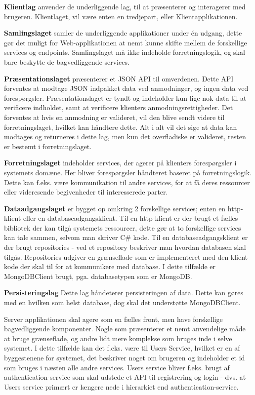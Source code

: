 \textbf{Klientlag} anvender de underliggende lag, til at præsenterer og interagerer med brugeren. Klientlaget, vil være enten en tredjepart, eller Klientapplikationen.

\textbf{Samlingslaget} samler de underliggende applikationer under én udgang, dette gør det muligt for Web-applikationen at nemt kunne skifte mellem de forskellige services og endpoints. Samlingslaget må ikke indeholde forretningslogik, og skal bare beskytte de bagvedliggende services.

\textbf{Præsentationslaget} præsenterer et JSON API til omverdenen. Dette API forventes at modtage JSON \cite[JSON]{converge-terms} indpakket data ved anmodninger, og ingen data ved forespørgsler. Præsentationslaget er tyndt og indeholder kun lige nok data til at verificere indholdet, samt at verificere klienters anmodningsrettigheder. Det forventes at hvis en anmodning er valideret, vil den blive sendt videre til forretningslaget, hvilket kan håndtere dette. Alt i alt vil det sige at data kan modtages og returneres i dette lag, men kun det overfladiske er valideret, resten er bestemt i forretningslaget.

\textbf{Forretningslaget} indeholder services, der agerer på klienters forespørgsler i systemets domæne. Her bliver forespørgsler håndteret baseret på forretningslogik. Dette kan f.eks. være kommunikation til andre services, for at få deres ressourcer eller videresende begivenheder til interesserede parter.

\textbf{Dataadgangslaget} er bygget op omkring 2 forskellige services; enten en http-klient eller en databaseadgangsklient. Til en http-klient er der brugt et fælles bibliotek der kan tilgå systemets ressourcer, dette gør at to forskellige services kan tale sammen, selvom man skriver C\# kode. Til en databaseadgangsklient er der brugt repositories - ved et repository beskriver man hvordan databasen skal tilgås. Repositories udgiver en grænseflade som er implementeret med den klient kode der skal til for at kommunikere med database. I dette tilfælde er MongoDBClient brugt, pga. databasetypen som er MongoDB.

\textbf{Persisteringslag} Dette lag håndeterer persisteringen af data. Dette kan gøres med en hvilken som helst database, dog skal det understøtte MongoDBClient.

Server applikationen skal agere som en fælles front, men have forskellige  bagvedliggende komponenter. Nogle som præsenterer et nemt anvendelige måde at bruge grænseflade, og andre lidt mere komplekse som bruges inde i selve systemet. I dette tilfælde kan det f.eks. være til Users Service, hvilket er en af byggestenene for systemet, det beskriver noget om brugeren og indeholder et id som bruges i næsten alle andre services. Users service bliver f.eks. brugt af authentication-service som skal udstede et API til registrering og login - dvs. at Users service primært er længere nede i hierarkiet end authentication-service.